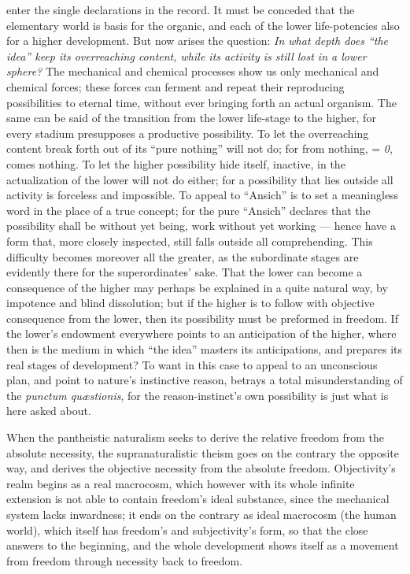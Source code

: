 \documentclass[12pt]{book}
\begin{document}
enter the single declarations in the record. It must be conceded that the
elementary world is basis for the organic, and each of the lower
life-potencies also for a higher development. But now arises the question:
\emph{In what depth does ``the idea'' keep its overreaching content, while
its activity is still lost in a lower sphere?} The mechanical and chemical
processes show us only mechanical and chemical forces; these forces can
ferment and repeat their reproducing possibilities to eternal time, without
ever bringing forth an actual organism. The same can be said of the
transition from the lower life-stage to the higher, for every stadium
presupposes a productive possibility. To let the overreaching content break
forth out of its ``pure nothing'' will not do; for from nothing, =
\textit{0}, comes nothing. To let the higher possibility hide itself,
inactive, in the actualization of the lower will not do either; for a
possibility that lies outside all activity is forceless and impossible. To
appeal to ``Ansich'' is to set a meaningless word in the place of a true
concept; for the pure ``Ansich'' declares that the possibility shall be
without yet being, work without yet working --- hence have a form that, more
closely inspected, still falls outside all comprehending. This difficulty
becomes moreover all the greater, as the subordinate stages are evidently
there for the superordinates' sake. That the lower can become a consequence
of the higher may perhaps be explained in a quite natural way, by impotence
and blind dissolution; but if the higher is to follow with objective
consequence from the lower, then its possibility must be preformed in
freedom. If the lower's endowment everywhere points to an anticipation of
the higher, where then is the medium in which ``the idea'' masters its
anticipations, and prepares its real stages of development? To want in this
case to appeal to an unconscious plan, and point to nature's instinctive
reason, betrays a total misunderstanding of the \textit{punctum
quæstionis}, for the reason-instinct's own possibility is just what is here
asked about.

When the pantheistic naturalism seeks to derive the relative freedom from
the absolute necessity, the supranaturalistic theism goes on the contrary
the opposite way, and derives the objective necessity from the absolute
freedom. Objectivity's realm begins as a real macrocosm, which however with
its whole infinite extension is not able to contain freedom's ideal
substance, since the mechanical system lacks inwardness; it ends on the
contrary as ideal macrocosm (the human world), which itself has freedom's
and subjectivity's form, so that the close answers to the beginning, and the
whole development shows itself as a movement from freedom through necessity
back to freedom.
\end{document}

